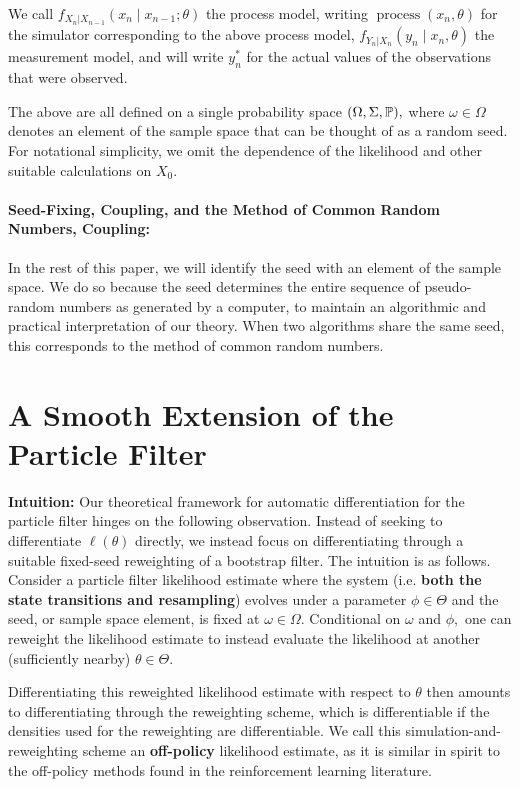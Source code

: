 \documentclass{article}
\begin{document}
We call $f_{X_n|X_{n-1}}\left(x_{n} \mid x_{n-1}; \theta\right)$ the process model, writing $\operatorname{process}\left(x_n, \theta\right)$ for the simulator corresponding to the above process model, $f_{Y_n|X_n}\left(y_n \mid x_n, \theta\right)$ the measurement model, and will write $y_n^*$ for the actual values of the observations that were observed.

The above are all defined on a single probability space $(\Omega, \Sigma, \mathbb{P}),$ where $\omega \in \Omega$ denotes an element of the sample space that can be thought of as a random seed. For notational simplicity, we omit the dependence of the likelihood and other suitable calculations on $X_0.$

\paragraph{Seed-Fixing, Coupling, and the Method of Common Random Numbers, Coupling:}

In the rest of this paper, we will identify the seed with an element of the sample space. We do so because the seed determines the entire sequence of pseudo-random numbers as generated by a computer, to maintain an algorithmic and practical interpretation of our theory. When two algorithms share the same seed, this corresponds to the method of common random numbers. 


\section{A Smooth Extension of the Particle Filter}

\textbf{Intuition:} Our theoretical framework for automatic differentiation for the particle filter hinges on the following observation. Instead of seeking to differentiate $\ell(\theta)$ directly, we instead focus on differentiating through a suitable fixed-seed reweighting of a bootstrap filter. The intuition is as follows. Consider a particle filter likelihood estimate where the system (i.e. \textbf{both the state transitions and resampling}) evolves under a parameter $\phi \in \Theta$ and the seed, or sample space element, is fixed at $\omega \in \Omega.$ Conditional on $\omega$ and $\phi,$ one can reweight the likelihood estimate to instead evaluate the likelihood at another (sufficiently nearby) $\theta \in \Theta.$ 

Differentiating this reweighted likelihood estimate with respect to $\theta$ then amounts to differentiating through the reweighting scheme, which is differentiable if the densities used for the reweighting are differentiable. We call this simulation-and-reweighting scheme an \textbf{off-policy} likelihood estimate, as it is similar in spirit to the off-policy methods found in the reinforcement learning literature.
\end{document}
